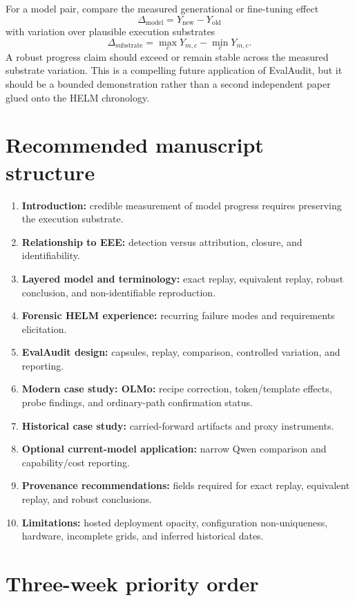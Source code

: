 \documentclass[11pt,oneside]{report}
\begin{document}
For a model pair, compare the measured generational or fine-tuning effect
\[
\Delta_{\mathrm{model}} = Y_{\mathrm{new}} - Y_{\mathrm{old}}
\]
with variation over plausible execution substrates
\[
\Delta_{\mathrm{substrate}} = \max_c Y_{m,c} - \min_c Y_{m,c}.
\]
A robust progress claim should exceed or remain stable across the measured substrate variation. This is a compelling future application of EvalAudit, but it should be a bounded demonstration rather than a second independent paper glued onto the HELM chronology.

\section{Recommended manuscript structure}

\begin{enumerate}
  \item \textbf{Introduction:} credible measurement of model progress requires preserving the execution substrate.
  \item \textbf{Relationship to EEE:} detection versus attribution, closure, and identifiability.
  \item \textbf{Layered model and terminology:} exact replay, equivalent replay, robust conclusion, and non-identifiable reproduction.
  \item \textbf{Forensic HELM experience:} recurring failure modes and requirements elicitation.
  \item \textbf{EvalAudit design:} capsules, replay, comparison, controlled variation, and reporting.
  \item \textbf{Modern case study: OLMo:} recipe correction, token/template effects, probe findings, and ordinary-path confirmation status.
  \item \textbf{Historical case study:} carried-forward artifacts and proxy instruments.
  \item \textbf{Optional current-model application:} narrow Qwen comparison and capability/cost reporting.
  \item \textbf{Provenance recommendations:} fields required for exact replay, equivalent replay, and robust conclusions.
  \item \textbf{Limitations:} hosted deployment opacity, configuration non-uniqueness, hardware, incomplete grids, and inferred historical dates.
\end{enumerate}

\section{Three-week priority order}
\end{document}
